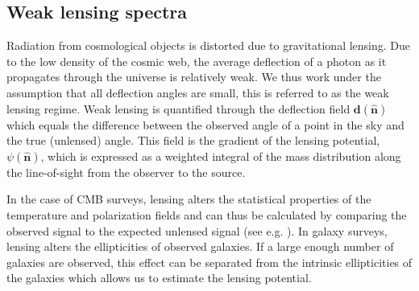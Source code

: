 \documentclass[11pt]{article} %
\begin{document}
\subsection{Weak lensing spectra}
Radiation from cosmological objects is distorted due to gravitational lensing. Due to the low density of the cosmic web, the average deflection of a photon as it propagates through the universe is relatively weak. We thus work under the assumption that all deflection angles are small, this is referred to as the weak lensing regime. Weak lensing is quantified through the deflection field $\mathbf d(\hat {\mathbf n})$ which equals the difference between the observed angle of a point in the sky and the true (unlensed) angle. This field is the gradient of the lensing potential, $\psi(\hat {\mathbf n})$, which is expressed as a weighted integral of the mass distribution along the line-of-sight from the observer to the source.

In the case of CMB surveys, lensing alters the statistical properties of the temperature and polarization fields and can thus be calculated by comparing the observed signal to the expected unlensed signal (see e.g. \cite{cmblensingestimator, Maniyar2021_QE_CMBLensing, Hirata_2003}). In galaxy surveys, lensing alters the ellipticities of observed galaxies. If a large enough number of galaxies are observed, this effect can be separated from the intrinsic ellipticities of the galaxies which allows us to estimate the lensing potential.
\end{document}

